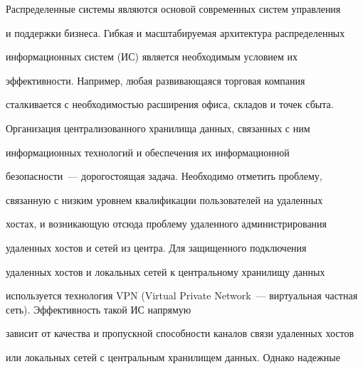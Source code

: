   




  










      \thispagestyle{headings}





      


            \label{st\stat}


            


\vspace*{6pt}


 


  Распределенные системы являются основой современных систем управления 


и поддержки бизнеса. Гибкая и масштабируемая архитектура распределенных 


информационных систем (ИС) является необходимым условием их 


эффективности. Например, любая развивающаяся торговая компания 


сталкивается с необхо\-ди\-мостью расширения офиса, складов и точек сбыта. 


Организация централизованного хранилища данных, связанных с ним 


информационных технологий и обеспечения их информационной 


безопасности~--- дорогостоящая задача. Необходимо отметить проблему, 


связанную с низким уровнем квалификации пользователей на удаленных 


хостах, и возникающую отсюда проблему удаленного администрирования 


удаленных хостов и сетей из центра. Для защищенного подключения 


удаленных хостов и локальных сетей к центральному хранилищу данных 


используется технология VPN (Virtual Private Network~--- виртуальная частная сеть). Эффективность такой ИС напрямую 


зависит от качества и пропускной способности каналов связи удаленных хостов 


или локальных сетей с центральным хранилищем данных. Однако надежные 


